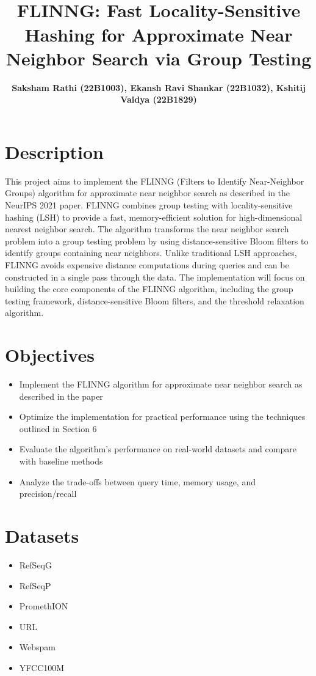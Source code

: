 \documentclass[a4paper,12pt]{article}
\title{\cooltitle{CS754 Project Proposal}\\ FLINNG: Fast Locality-Sensitive Hashing for Approximate Near Neighbor Search via Group Testing}
\author{{\bf Saksham Rathi (22B1003), Ekansh Ravi Shankar (22B1032), Kshitij Vaidya (22B1829)}}
\date{}
\begin{document}
\maketitle
\section*{Description}
This project aims to implement the FLINNG (Filters to Identify Near-Neighbor Groups) algorithm for approximate near neighbor search as described in the NeurIPS 2021 paper. FLINNG combines group testing with locality-sensitive hashing (LSH) to provide a fast, memory-efficient solution for high-dimensional nearest neighbor search. The algorithm transforms the near neighbor search problem into a group testing problem by using distance-sensitive Bloom filters to identify groups containing near neighbors. Unlike traditional LSH approaches, FLINNG avoids expensive distance computations during queries and can be constructed in a single pass through the data.
The implementation will focus on building the core components of the FLINNG algorithm, including the group testing framework, distance-sensitive Bloom filters, and the threshold relaxation algorithm.

\section*{Objectives}
\begin{itemize}
  \item Implement the FLINNG algorithm for approximate near neighbor search as described in the paper
  \item Optimize the implementation for practical performance using the techniques outlined in Section 6
  \item Evaluate the algorithm's performance on real-world datasets and compare with baseline methods
  \item Analyze the trade-offs between query time, memory usage, and precision/recall
\end{itemize}

\section*{Datasets}
\begin{itemize}
  \item RefSeqG 
  \item RefSeqP 
  \item PromethION
  \item URL
  \item Webspam 
  \item YFCC100M
\end{itemize}
\end{document}
